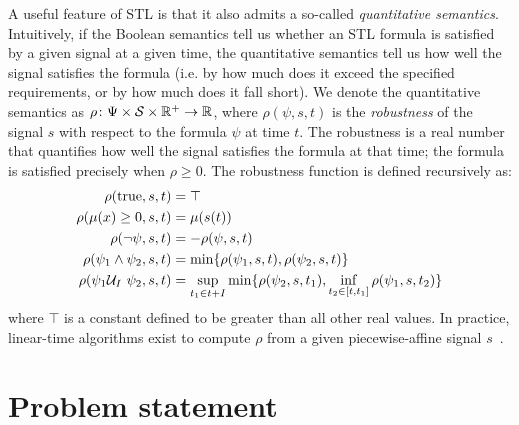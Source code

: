 A useful feature of STL is that it also admits a so-called \textit{quantitative semantics}. Intuitively, if the Boolean semantics tell us whether an STL formula is satisfied by a given signal at a given time, the quantitative semantics tell us how well the signal satisfies the formula (i.e. by how much does it exceed the specified requirements, or by how much does it fall short). We denote the quantitative semantics as $\rho \colon \Psi \times \mathcal{S} \times \mathbb{R}^+ \rightarrow \mathbb{R}$, where $\rho(\psi, s, t)$ is the \textit{robustness} of the signal $s$ with respect to the formula $\psi$ at time $t$. The robustness is a real number that quantifies how well the signal satisfies the formula at that time; the formula is satisfied precisely when $\rho \geq 0$. The robustness function is defined recursively as:
\begin{align*}
	\rho(\text{true}, s, t)             & = \top                                                                                             \\
	\rho(\mu(x) \geq 0, s, t)           & = \mu(s(t))                                                                                        \\
	\rho(\neg\psi, s, t)                & = -\rho(\psi, s, t)                                                                                \\
	\rho(\psi_1 \wedge \psi_2, s, t)    & = \min\{\rho(\psi_1, s, t), \rho(\psi_2, s, t)\}                                                   \\
	\rho(\psi_1 \mathcal{U}_I\ \psi_2, s, t) & = \sup_{t_1 \in t + I} \min\{\rho(\psi_2, s, t_1),  \inf_{t_2 \in [t, t_1]} \rho(\psi_1, s, t_2)\}
\end{align*}
where $\top$ is a constant defined to be greater than all other real values. In practice, linear-time algorithms exist to compute $\rho$ from a given piecewise-affine signal $s$~\cite{donzeEfficientRobustMonitoring2013a}.

\section{Problem statement}

